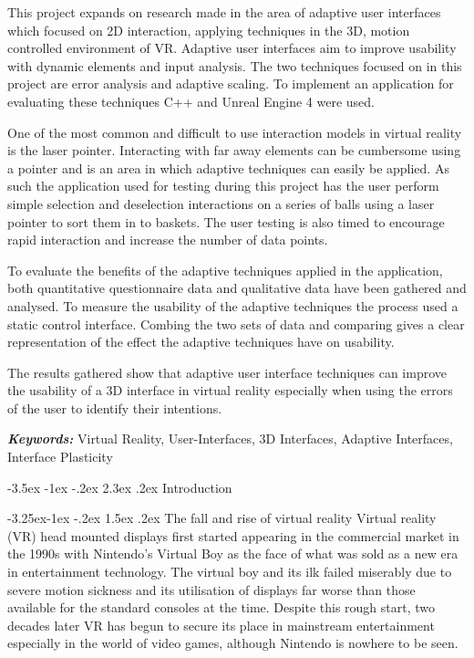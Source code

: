 \documentclass[12pt]{article}
\makeatletter
\providecommand{\keywords}[1]
{\textbf{\textit{Keywords: }} #1}
\renewcommand{\section}{\@startsection {section}{1}{\z@}%
             {-3.5ex \@plus -1ex \@minus -.2ex}%
             {2.3ex \@plus .2ex}%
             {\normalfont\Large\scshape\bfseries}}
\renewcommand{\subsection}{\@startsection{subsection}{2}{\z@}%
             {-3.25ex\@plus -1ex \@minus -.2ex}%
             {1.5ex \@plus .2ex}%
             {\normalfont\large\scshape\bfseries}}
\makeatother
\begin{document}
This project expands on research made in the area of adaptive user interfaces which focused on 2D interaction, applying techniques in the 3D, motion controlled environment of VR. Adaptive user interfaces aim to improve usability with dynamic elements and input analysis. The two techniques focused on in this project are error analysis and adaptive scaling. To implement an application for evaluating these techniques C++ and Unreal Engine 4 were used.

One of the most common and difficult to use interaction models in virtual reality is the laser pointer. Interacting with far away elements can be cumbersome using a pointer and is an area in which adaptive techniques can easily be applied. As such the application used for testing during this project has the user perform simple selection and deselection interactions on a series of balls using a laser pointer to sort them in to baskets. The user testing is also timed to encourage rapid interaction and increase the number of data points.

To evaluate the benefits of the adaptive techniques applied in the application, both quantitative questionnaire data and qualitative data have been gathered and analysed. To measure the usability of the adaptive techniques the process used a static control interface. Combing the two sets of data and comparing gives a clear representation of the effect the adaptive techniques have on usability.

The results gathered show that adaptive user interface techniques can improve the usability of a 3D interface in virtual reality especially when using the errors of the user to identify their intentions.

\keywords{Virtual Reality, User-Interfaces, 3D Interfaces, Adaptive Interfaces, Interface Plasticity}

\section{Introduction}

\subsection{The fall and rise of virtual reality}
Virtual reality (VR) head mounted displays first started appearing in the commercial market in the 1990s with Nintendo's Virtual Boy as the face of what was sold as a new era in entertainment technology. The virtual boy and its ilk failed miserably due to severe motion sickness and its utilisation of displays far worse than those available for the standard consoles at the time. Despite this rough start, two decades later VR has begun to secure its place in mainstream entertainment especially in the world of video games, although Nintendo is nowhere to be seen. 
\end{document}
